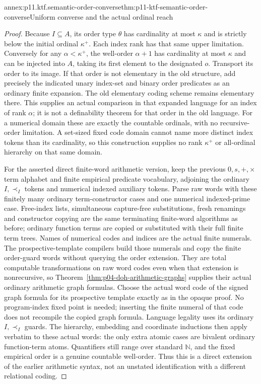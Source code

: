 \begin{annexitem}{annex:p11.ktf.semantic-order-converse}{thm:p11-ktf-semantic-order-converse}{Uniform converse and the actual ordinal reach}
\begin{proof}
Because \(I\subseteq A\), its order type \(\theta\)
has cardinality at most \(\kappa\) and is strictly below
the initial ordinal \(\kappa^+\). Each index rank has that
same upper limitation. Conversely for any \(\alpha<\kappa^+\),
the well-order \(\alpha+1\) has cardinality at most \(\kappa\)
and can be injected into \(A\), taking its first element to
the designated \(o\). Transport its order to its image. If
that order is not elementary in the old structure, add precisely
the indicated unary index-set and binary order predicates as an
ordinary finite expansion. The old elementary coding scheme
remains elementary there. This supplies an actual comparison in
that expanded language for an index of rank \(\alpha\);
it is not a definability theorem for that order in the old language.
For a numerical domain these are exactly the countable ordinals,
with no recursive-order limitation. A set-sized fixed code domain
cannot name more distinct index tokens than its cardinality, so
this construction supplies no rank \(\kappa^+\) or all-ordinal
hierarchy on that same domain.

For the asserted direct finite-word arithmetic version, keep the
previous \(0,s,+,\times\) term alphabet and finite empirical
predicate vocabulary, adjoining the ordinary \(I,\prec_I\)
tokens and numerical indexed auxiliary tokens. Parse raw words
with these finitely many ordinary term-constructor cases and one
numerical indexed-prime case. Free-index lists, simultaneous
capture-free substitutions, fresh renamings and constructor copying
are the same terminating finite-word algorithms as before; ordinary
function terms are copied or substituted with their full finite
term trees. Names of numerical codes and indices are the actual
finite numerals. The prospective-template compilers build those
numerals and copy the finite order-guard words without querying
the order extension. They are total computable transformations
on raw word codes even when that extension is nonrecursive, so
Theorem~\ref{thm:p04-doh-arithmetic-graphs} supplies their actual
ordinary arithmetic graph formulas. Choose the actual word code
of the signed graph formula for its prospective template exactly
as in the opaque proof. No program-index fixed point is needed;
inserting the finite numeral of that code does not recompile
the copied graph formula. Language legality uses its ordinary
\(I,\prec_I\) guards. The hierarchy, embedding and coordinate
inductions then apply verbatim to these actual words: the only
extra atomic cases are bivalent ordinary function-term atoms.
Quantifiers still range over standard \(\mathbb N\), and
the fixed empirical order is a genuine countable well-order.
Thus this is a direct extension of the earlier arithmetic syntax,
not an unstated identification with a different relational coding.


\end{proof}
\end{annexitem}
